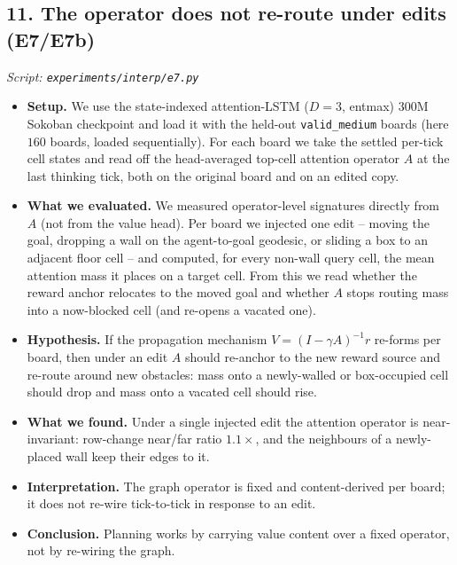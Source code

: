 \documentclass[11pt]{article}
\begin{document}
\subsection*{11. The operator does not re-route under edits (E7/E7b)}
\textit{Script: \texttt{experiments/interp/e7.py}}
\begin{itemize}
\item \textbf{Setup.} We use the state-indexed attention-LSTM ($D=3$, entmax) $300$M Sokoban checkpoint and load it with the held-out \texttt{valid\_medium} boards (here $160$ boards, loaded sequentially). For each board we take the settled per-tick cell states and read off the head-averaged top-cell attention operator $A$ at the last thinking tick, both on the original board and on an edited copy.
\item \textbf{What we evaluated.} We measured operator-level signatures directly from $A$ (not from the value head). Per board we injected one edit -- moving the goal, dropping a wall on the agent-to-goal geodesic, or sliding a box to an adjacent floor cell -- and computed, for every non-wall query cell, the mean attention mass it places on a target cell. From this we read whether the reward anchor relocates to the moved goal and whether $A$ stops routing mass into a now-blocked cell (and re-opens a vacated one).
\item \textbf{Hypothesis.} If the propagation mechanism $V=(I-\gamma A)^{-1}r$ re-forms per board, then under an edit $A$ should re-anchor to the new reward source and re-route around new obstacles: mass onto a newly-walled or box-occupied cell should drop and mass onto a vacated cell should rise.
\item \textbf{What we found.} Under a single injected edit the attention operator is near-invariant: row-change near/far ratio $1.1\times$, and the neighbours of a newly-placed wall keep their edges to it.
\item \textbf{Interpretation.} The graph operator is fixed and content-derived per board; it does not re-wire tick-to-tick in response to an edit.
\item \textbf{Conclusion.} Planning works by carrying value content over a fixed operator, not by re-wiring the graph.
\end{itemize}
\clearpage
\end{document}
